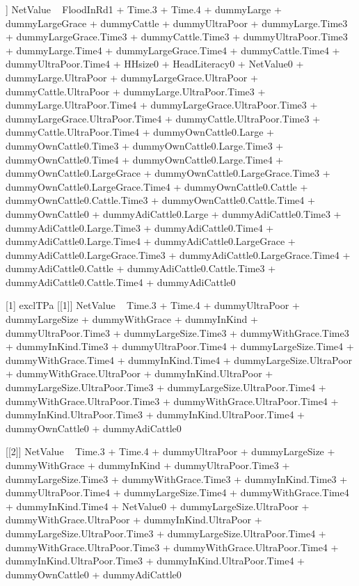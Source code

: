\begin{Schunk}
\begin{Soutput}
[[5]]
NetValue ~ FloodInRd1 + Time.3 + Time.4 + dummyLarge + dummyLargeGrace + 
    dummyCattle + dummyUltraPoor + dummyLarge.Time3 + dummyLargeGrace.Time3 + 
    dummyCattle.Time3 + dummyUltraPoor.Time3 + dummyLarge.Time4 + 
    dummyLargeGrace.Time4 + dummyCattle.Time4 + dummyUltraPoor.Time4 + 
    HHsize0 + HeadLiteracy0 + NetValue0 + dummyLarge.UltraPoor + 
    dummyLargeGrace.UltraPoor + dummyCattle.UltraPoor + dummyLarge.UltraPoor.Time3 + 
    dummyLarge.UltraPoor.Time4 + dummyLargeGrace.UltraPoor.Time3 + 
    dummyLargeGrace.UltraPoor.Time4 + dummyCattle.UltraPoor.Time3 + 
    dummyCattle.UltraPoor.Time4 + dummyOwnCattle0.Large + dummyOwnCattle0.Time3 + 
    dummyOwnCattle0.Large.Time3 + dummyOwnCattle0.Time4 + dummyOwnCattle0.Large.Time4 + 
    dummyOwnCattle0.LargeGrace + dummyOwnCattle0.LargeGrace.Time3 + 
    dummyOwnCattle0.LargeGrace.Time4 + dummyOwnCattle0.Cattle + 
    dummyOwnCattle0.Cattle.Time3 + dummyOwnCattle0.Cattle.Time4 + 
    dummyOwnCattle0 + dummyAdiCattle0.Large + dummyAdiCattle0.Time3 + 
    dummyAdiCattle0.Large.Time3 + dummyAdiCattle0.Time4 + dummyAdiCattle0.Large.Time4 + 
    dummyAdiCattle0.LargeGrace + dummyAdiCattle0.LargeGrace.Time3 + 
    dummyAdiCattle0.LargeGrace.Time4 + dummyAdiCattle0.Cattle + 
    dummyAdiCattle0.Cattle.Time3 + dummyAdiCattle0.Cattle.Time4 + 
    dummyAdiCattle0

[1] exclTPa
[[1]]
NetValue ~ Time.3 + Time.4 + dummyUltraPoor + dummyLargeSize + 
    dummyWithGrace + dummyInKind + dummyUltraPoor.Time3 + dummyLargeSize.Time3 + 
    dummyWithGrace.Time3 + dummyInKind.Time3 + dummyUltraPoor.Time4 + 
    dummyLargeSize.Time4 + dummyWithGrace.Time4 + dummyInKind.Time4 + 
    dummyLargeSize.UltraPoor + dummyWithGrace.UltraPoor + dummyInKind.UltraPoor + 
    dummyLargeSize.UltraPoor.Time3 + dummyLargeSize.UltraPoor.Time4 + 
    dummyWithGrace.UltraPoor.Time3 + dummyWithGrace.UltraPoor.Time4 + 
    dummyInKind.UltraPoor.Time3 + dummyInKind.UltraPoor.Time4 + 
    dummyOwnCattle0 + dummyAdiCattle0

[[2]]
NetValue ~ Time.3 + Time.4 + dummyUltraPoor + dummyLargeSize + 
    dummyWithGrace + dummyInKind + dummyUltraPoor.Time3 + dummyLargeSize.Time3 + 
    dummyWithGrace.Time3 + dummyInKind.Time3 + dummyUltraPoor.Time4 + 
    dummyLargeSize.Time4 + dummyWithGrace.Time4 + dummyInKind.Time4 + 
    NetValue0 + dummyLargeSize.UltraPoor + dummyWithGrace.UltraPoor + 
    dummyInKind.UltraPoor + dummyLargeSize.UltraPoor.Time3 + 
    dummyLargeSize.UltraPoor.Time4 + dummyWithGrace.UltraPoor.Time3 + 
    dummyWithGrace.UltraPoor.Time4 + dummyInKind.UltraPoor.Time3 + 
    dummyInKind.UltraPoor.Time4 + dummyOwnCattle0 + dummyAdiCattle0


\end{Soutput}
\end{Schunk}
